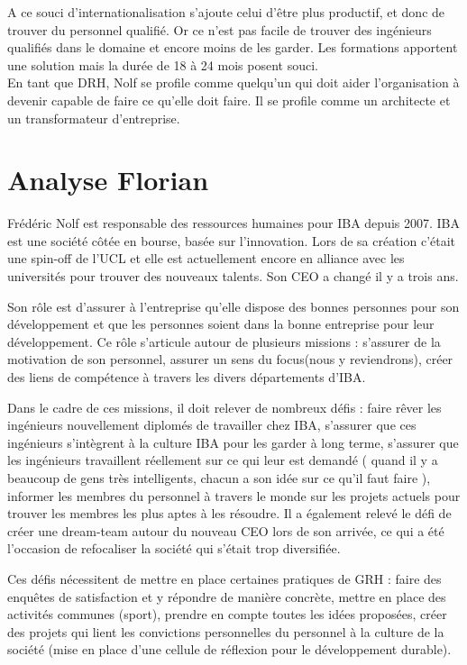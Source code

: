 \documentclass[12pt]{article}
\begin{document}
A ce souci d'internationalisation s'ajoute celui d'être plus productif, et donc de trouver du personnel qualifié. Or ce n'est pas facile de trouver des ingénieurs qualifiés dans le domaine et encore moins de les garder. Les formations apportent une solution mais la durée de 18 à 24 mois posent souci.\\ 

En tant que DRH, Nolf se profile comme quelqu'un qui doit aider l'organisation à devenir capable de faire ce qu'elle doit faire. Il se profile comme un architecte et un transformateur d'entreprise.

\section{Analyse Florian}

Frédéric Nolf est responsable des ressources humaines pour IBA depuis 2007. IBA est une société côtée en bourse, basée sur l'innovation. Lors de sa création c'était une spin-off de l'UCL et elle est actuellement encore en alliance avec les universités pour trouver des nouveaux talents. Son CEO a changé il y a trois ans.

Son rôle est d'assurer à l'entreprise qu'elle dispose des bonnes personnes pour son développement et que les personnes soient dans la bonne entreprise pour leur développement. Ce rôle s'articule autour de plusieurs missions : s'assurer de la motivation de son personnel, assurer un \og{} sens du focus\fg{}(nous y reviendrons), créer des liens de compétence à travers les divers départements d'IBA.

Dans le cadre de ces missions, il doit relever de nombreux défis : faire rêver les ingénieurs nouvellement diplomés de travailler chez IBA, s'assurer que ces ingénieurs s'intègrent à la culture IBA pour les garder à long terme, s'assurer que les ingénieurs travaillent réellement sur ce qui leur est demandé (\og{} quand il y a beaucoup de gens très intelligents, chacun a son idée sur ce qu'il faut faire \fg{}), informer les membres du personnel à travers le monde sur les projets actuels pour trouver les membres les plus aptes à les résoudre. Il a également relevé le défi de créer une \og{}dream-team\fg{} autour du nouveau CEO lors de son arrivée, ce qui a été l'occasion de refocaliser la société qui s'était trop diversifiée.

Ces défis nécessitent de mettre en place certaines pratiques de GRH : faire des enquêtes de satisfaction et y répondre de manière concrète, mettre en place des activités communes (sport), prendre en compte toutes les idées proposées, créer des projets qui lient les convictions personnelles du personnel à la culture de la société (mise en place d'une cellule de réflexion pour le développement durable).
\end{document}
